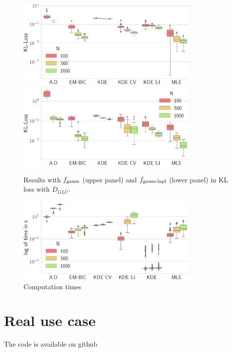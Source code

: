 \begin{figure}
\center
    \includegraphics[width=0.8\textwidth]{./TeX_files/res_gauss_KL_GLU.png}
    \includegraphics[width=0.8\textwidth]{./TeX_files/res_lapl_gauss_KL_GLU.png}
    \caption{Results with $f_{\textnormal{gauss}}$ (upper panel) and $f_{\textnormal{gauss-lapl}}$ 
    (lower panel) in KL loss with $D_{GLU}$.}
    \label{fig:res_ext_KL_GLU}
\end{figure} 


\begin{figure}
\center
    \includegraphics[width=0.8\textwidth]{./TeX_files/res_times.png}
    \caption{Computation times}
    \label{fig:res_times}
\end{figure}

\section{Real use case}

The code is available on github